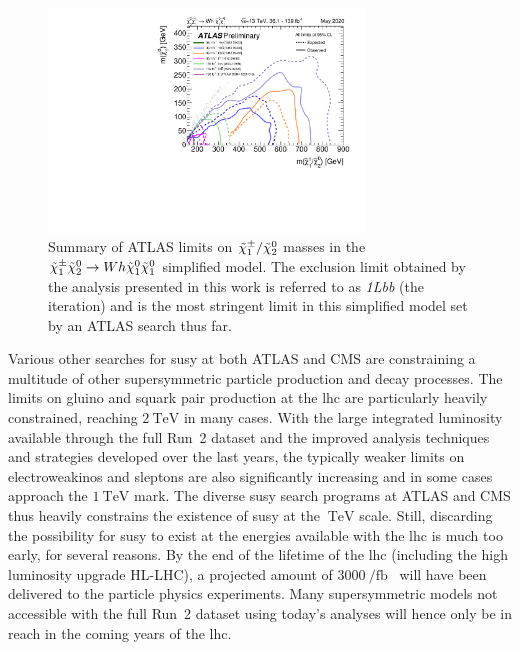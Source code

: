  \begin{figure}
	\centering\includegraphics[width=0.75\textwidth]{fig_15}
	\caption{Summary of ATLAS limits on $\tilde{\chi}_1^\pm/\tilde{\chi}_2^0$ masses in the $\tilde{\chi}_1^\pm\tilde{\chi}_2^0\rightarrow Wh\tilde{\chi}_1^0\tilde{\chi}_1^0$ simplified model. The exclusion limit obtained by the analysis presented in this work is referred to as \textit{1Lbb} (the \onethirtynineifb iteration) and is the most stringent limit in this simplified model set by an ATLAS search thus far.}
	\label{fig:result_wh_summary}
\end{figure}

Various other searches for \gls{susy} at both ATLAS and CMS are constraining a multitude of other supersymmetric particle production and decay processes. The limits on gluino and squark pair production at the \gls{lhc} are particularly heavily constrained, reaching $\SI{2}{\TeV}$ in many cases. With the large integrated luminosity available through the full Run~2 dataset and the improved analysis techniques and strategies developed over the last years, the typically weaker limits on electroweakinos and sleptons are also significantly increasing and in some cases approach the $\SI{1}{\TeV}$ mark. The diverse \gls{susy} search programs at ATLAS and CMS thus heavily constrains the existence of \gls{susy} at the $\SI{}{\TeV}$ scale. 
Still, discarding the possibility for \gls{susy} to exist at the energies available with the \gls{lhc} is much too early, for several reasons. By the end of the lifetime of the \gls{lhc} (including the high luminosity upgrade HL-LHC), a projected amount of $\SI{3000}{\per\femto\barn}$~\cite{Apollinari:2116337} will have been delivered to the particle physics experiments. 
Many supersymmetric models not accessible with the full Run~2 dataset using today's analyses will hence only be in reach in the coming years of the \gls{lhc}.

